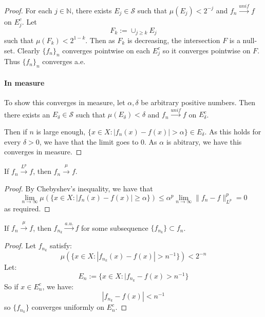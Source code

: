 \documentclass{article}
\theoremstyle{definition}
\numberwithin{theorem}{section}
\numberwithin{equation}{section}
\begin{document}
\begin{proof}
	For each $j \in \mathbb{N}$, there exists $E_j \in \mathcal{S}$ such that $\mu(E_j) < 2^{-j}$ and $f_n \xrightarrow{unif} f$ on $E_j^c$. Let
	\begin{equation}
		F_k := \cup_{j \geq k} E_j
	\end{equation}
	such that $\mu(F_k) < 2^{1 - k}$. 
	Then as $F_k$ is decreasing, the intersection $F$ is a null-set. Clearly $\{f_n\}_n$ converges pointwise on each $E_j^c$ so it converges pointwise on $F$. Thus $\{f_n\}_n$ converges a.e.
	\paragraph{In measure}
	To show this converges in measure, let $\alpha, \delta$ be arbitrary positive numbers. Then there exists an $E_\delta \in \mathcal{S}$ such that $\mu(E_\delta) < \delta$ and $f_n \xrightarrow{unif} f$ on $E_\delta^c$. 
	
	Then if $n$ is large enough, $\{ x \in X : |f_n(x) - f(x)| > \alpha\} \in E_\delta$. 
	As this holds for every $\delta > 0$, we have that the limit goes to 0. As $\alpha$ is abitrary, we have this converges in measure.
\end{proof} 

If $f_n \xrightarrow{L^p} f$, then $f_n \xrightarrow{\mu} f$. 

\begin{proof}
	By Chebyshev's inequality, we have that
	\begin{equation}
		\lim_{n \rightarrow \infty} \mu\left( \{ x \in X : |f_n(x) - f(x)| \geq \alpha\}\right) \leq \alpha^p \lim_{n \rightarrow \infty} \|f_n - f \|_{L^p}^p = 0
	\end{equation}
	as required.
\end{proof}

If $f_n \xrightarrow{\mu} f$, then $f_{n_k} \xrightarrow{a.u.} f$ for some subsequence $\{ f_{n_k}\} \subset {f_n}$. 

\begin{proof}
	Let ${f_{n_k}}$ satisfy:
	\begin{equation}
		\mu(\{x \in X : |f_{n_k}(x) - f(x) | > n^{-1}\}) < 2^{-n}
	\end{equation}
	Let:
	\begin{equation}
		E_n := \{ x \in X : |f_{n_k} - f(x) > n^{-1}\}
	\end{equation}
	So if $x \in E^{c}_n$, we have:
	\begin{equation}
		|f_{n_k} - f(x)| < n^{-1}
	\end{equation}
	so $\{ f_{n_k}\}$ converges uniformly on $E_n^c$. 
\end{proof}
\end{document}
